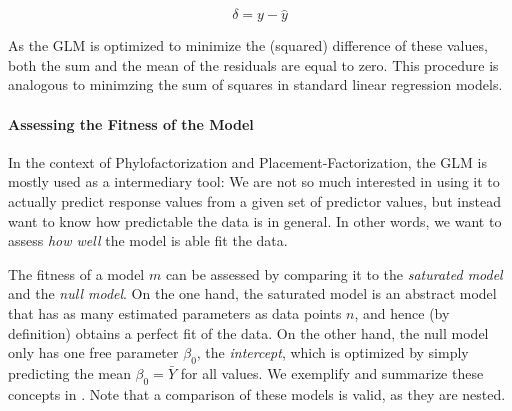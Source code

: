 \begin{equation}
    \label{ch:Factorization:sub:GLM:eq:residuals}
    \delta = y - \hat{y}
\end{equation}

As the \ac{GLM} is optimized to minimize the (squared) difference of these values,
both the sum and the mean of the residuals are equal to zero.
This procedure is analogous to minimzing the sum of squares in standard linear regression models.



\paragraph{Assessing the Fitness of the Model}
\label{ch:Factorization:sec:Methods:sub:GLMs:par:Fitness}

In the context of Phylofactorization and Placement-Factorization,
the \ac{GLM} is mostly used as a intermediary tool:
We are not so much interested in using it to actually predict response values from a given set of predictor values,
but instead want to know how predictable the data is in general.
In other words, we want to assess \emph{how well} the model is able fit the data.


The fitness of a model $m$ can be assessed by comparing it to the \emph{saturated model} and the \emph{null model}.
On the one hand, the saturated model is an abstract model that has as many estimated parameters as data points $n$,
and hence (by definition) obtains a perfect fit of the data.
On the other hand, the null model only has one free parameter $\beta_0$, the \emph{intercept},
which is optimized by simply predicting the mean $\beta_0 = \bar{Y}$ for all values.
We exemplify and summarize these concepts in .
Note that a comparison of these models is valid, as they are nested.

